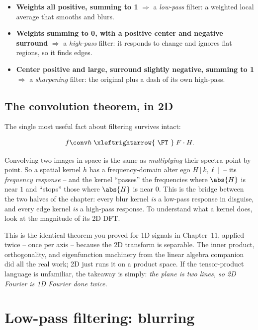 \begin{itemize}
\item \textbf{Weights all positive, summing to 1} $\Rightarrow$ a \emph{low-pass}
filter: a weighted local average that smooths and blurs.
\item \textbf{Weights summing to 0, with a positive center and negative
surround} $\Rightarrow$ a \emph{high-pass} filter: it responds to change and
ignores flat regions, so it finds edges.
\item \textbf{Center positive and large, surround slightly negative, summing to
1} $\Rightarrow$ a \emph{sharpening} filter: the original plus a dash of its own
high-pass.
\end{itemize}

\subsection{The convolution theorem, in 2D}
\label{ch31:conv-thm}

The single most useful fact about filtering survives intact:

\begin{equation}
f \conv h \;\xleftrightarrow{\ \FT\ }\; F \cdot H .
\label{ch31:convthm}
\end{equation}

Convolving two images in space is the same as \emph{multiplying} their spectra
point by point. So a spatial kernel $h$ has a frequency-domain alter ego $H[k,\ell]$
-- its \emph{frequency response} -- and the kernel ``passes'' the frequencies where
$\abs{H}$ is near $1$ and ``stops'' those where $\abs{H}$ is near $0$. This is the
bridge between the two halves of the chapter: every blur kernel \emph{is} a
low-pass response in disguise, and every edge kernel \emph{is} a high-pass
response. To understand what a kernel does, look at the magnitude of its 2D DFT.

\begin{connectionbox}
This is the identical theorem you proved for 1D signals in
Chapter~11, applied twice -- once per axis -- because the 2D transform is separable.
The inner product, orthogonality, and eigenfunction machinery from the linear
algebra companion did all the real work; 2D just runs it on a product space. If the
tensor-product language is unfamiliar, the takeaway is simply: \emph{the plane is
two lines, so 2D Fourier is 1D Fourier done twice.}
\end{connectionbox}

\section{Low-pass filtering: blurring}
\label{ch31:lowpass}

